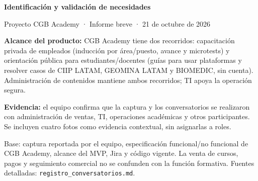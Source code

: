 \documentclass[10pt,a4paper]{extarticle}
\begin{document}
\small
\begin{center}
{\Large\bfseries Identificación y validación de necesidades}\par
Proyecto CGB Academy · Informe breve · 21 de octubre de 2026
\end{center}
\vspace{-4pt}
\textbf{Alcance del producto:} CGB Academy tiene dos recorridos: capacitación privada de empleados (inducción por área/puesto, avance y microtests) y orientación pública para estudiantes/docentes (guías para usar plataformas y resolver casos de CIIP LATAM, GEOMINA LATAM y BIOMEDIC, sin cuenta). Administración de contenidos mantiene ambos recorridos; TI apoya la operación segura.

\textbf{Evidencia:} el equipo confirma que la captura y los conversatorios se realizaron con administración de ventas, TI, operaciones académicas y otros participantes. Se incluyen cuatro fotos como evidencia contextual, sin asignarlas a roles.

Base: captura reportada por el equipo, especificación funcional/no funcional de CGB Academy, alcance del MVP, Jira y código vigente. La venta de cursos, pagos y seguimiento comercial no se confunden con la función formativa. Fuentes detalladas: \texttt{registro\_conversatorios.md}.
\end{document}
